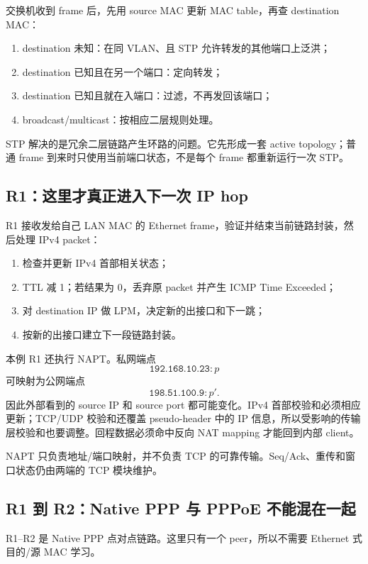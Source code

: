 \documentclass[UTF8,fontset=none,11pt,a4paper]{ctexart}
\begin{document}
交换机收到 frame 后，先用 source MAC 更新 MAC table，再查 destination MAC：

\begin{enumerate}
  \item destination 未知：在同 VLAN、且 STP 允许转发的其他端口上泛洪；
  \item destination 已知且在另一个端口：定向转发；
  \item destination 已知且就在入端口：过滤，不再发回该端口；
  \item broadcast/multicast：按相应二层规则处理。
\end{enumerate}

STP 解决的是冗余二层链路产生环路的问题。它先形成一套 active topology；普通 frame 到来时只使用当前端口状态，不是每个 frame 都重新运行一次 STP。

\subsection{R1：这里才真正进入下一次 IP hop}

R1 接收发给自己 LAN MAC 的 Ethernet frame，验证并结束当前链路封装，然后处理 IPv4 packet：

\begin{enumerate}
  \item 检查并更新 IPv4 首部相关状态；
  \item TTL 减 1；若结果为 0，丢弃原 packet 并产生 ICMP Time Exceeded；
  \item 对 destination IP 做 LPM，决定新的出接口和下一跳；
  \item 按新的出接口建立下一段链路封装。
\end{enumerate}

本例 R1 还执行 NAPT。私网端点
\[
\texttt{192.168.10.23}:p
\]
可映射为公网端点
\[
\texttt{198.51.100.9}:p'.
\]
因此外部看到的 source IP 和 source port 都可能变化。IPv4 首部校验和必须相应更新；TCP/UDP 校验和还覆盖 pseudo-header 中的 IP 信息，所以受影响的传输层校验和也要调整。回程数据必须命中反向 NAT mapping 才能回到内部 client。

NAPT 只负责地址/端口映射，并不负责 TCP 的可靠传输。Seq/Ack、重传和窗口状态仍由两端的 TCP 模块维护。

\subsection{R1 到 R2：Native PPP 与 PPPoE 不能混在一起}

R1--R2 是 Native PPP 点对点链路。这里只有一个 peer，所以不需要 Ethernet 式目的/源 MAC 学习。
\end{document}
